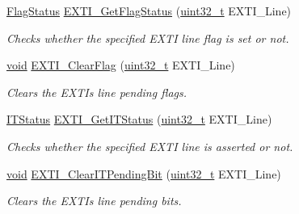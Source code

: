 \begin{DoxyCompactItemize}
\hyperlink{agilefox_2library_2inc_2stm32f10x__type_8h_a89136caac2e14c55151f527ac02daaff}{Flag\+Status} \hyperlink{group___e_x_t_i___exported___functions_ga0ce06e6b312592df149800d63218cffa}{E\+X\+T\+I\+\_\+\+Get\+Flag\+Status} (\hyperlink{_p_e___types_8h_a33594304e786b158f3fb30289278f5af}{uint32\+\_\+t} E\+X\+T\+I\+\_\+\+Line)
\begin{DoxyCompactList}\small\item\em Checks whether the specified E\+X\+TI line flag is set or not. \end{DoxyCompactList}\item 
\hyperlink{usb__devapi_8h_afabf60e7f57651d6d595a02c75f07cd0}{void} \hyperlink{group___e_x_t_i___exported___functions_ga8e07aaaa286dea4803605d5968850a92}{E\+X\+T\+I\+\_\+\+Clear\+Flag} (\hyperlink{_p_e___types_8h_a33594304e786b158f3fb30289278f5af}{uint32\+\_\+t} E\+X\+T\+I\+\_\+\+Line)
\begin{DoxyCompactList}\small\item\em Clears the E\+X\+TI\textquotesingle{}s line pending flags. \end{DoxyCompactList}\item 
\hyperlink{agilefox_2library_2inc_2stm32f10x__type_8h_aacbd7ed539db0aacd973a0f6eca34074}{I\+T\+Status} \hyperlink{group___e_x_t_i___exported___functions_gaf7b51519062ae42fd27ee689cab364aa}{E\+X\+T\+I\+\_\+\+Get\+I\+T\+Status} (\hyperlink{_p_e___types_8h_a33594304e786b158f3fb30289278f5af}{uint32\+\_\+t} E\+X\+T\+I\+\_\+\+Line)
\begin{DoxyCompactList}\small\item\em Checks whether the specified E\+X\+TI line is asserted or not. \end{DoxyCompactList}\item 
\hyperlink{usb__devapi_8h_afabf60e7f57651d6d595a02c75f07cd0}{void} \hyperlink{group___e_x_t_i___exported___functions_ga3652a7e682728b310c124e7e974d1468}{E\+X\+T\+I\+\_\+\+Clear\+I\+T\+Pending\+Bit} (\hyperlink{_p_e___types_8h_a33594304e786b158f3fb30289278f5af}{uint32\+\_\+t} E\+X\+T\+I\+\_\+\+Line)
\begin{DoxyCompactList}\small\item\em Clears the E\+X\+TI\textquotesingle{}s line pending bits. \end{DoxyCompactList}\end{DoxyCompactItemize}
